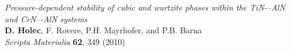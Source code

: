 \newPublication
{ \textit{Pressure-dependent stability of cubic and wurtzite phases within the TiN-–AlN and CrN–-AlN systems}\\
  \textbf{D. Holec}, F. Rovere, P.H. Mayrhofer, and P.B. Barna\\
  \textit{Scripta Materialia} \textbf{62}, 349 (2010)}


\endinput
